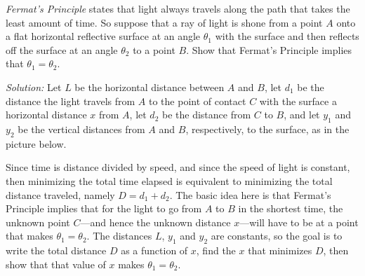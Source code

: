 \begin{exmp}\label{exmp:minmax4}
\noindent\emph{Fermat's Principle} states that light
always travels along the path that takes the least amount of time. So suppose
that a ray of light is shone from a point $A$ onto a flat horizontal reflective
surface at an angle $\theta_1$ with the surface and then reflects off the
surface at an angle $\theta_2$ to a point $B$. Show that Fermat's Principle
implies that $\theta_1 = \theta_2$.\vspace{1mm}
\par\noindent\emph{Solution:} Let $L$ be the horizontal distance between $A$ and
$B$, let $d_1$ be the distance the light travels from $A$ to the point of contact
$C$ with the surface a horizontal distance $x$ from $A$, let $d_2$ be the
distance from $C$ to $B$, and let $y_1$ and $y_2$ be the vertical distances
from $A$ and $B$, respectively, to the surface, as in the picture below.

\begin{center}
\end{center}

Since time is distance divided by speed, and since the speed of light is
constant, then minimizing the total time elapsed is equivalent to minimizing the
total distance traveled, namely $D = d_1 + d_2$. The basic idea here is that
Fermat's Principle implies that for the light to go from $A$ to $B$ in the
shortest time, the unknown point $C$---and hence the unknown distance $x$---will
have to be at a point that makes $\theta_1 = \theta_2$. The distances $L$,
$y_1$ and $y_2$ are constants, so the goal is to write the total distance $D$ as
a function of $x$, find the $x$ that minimizes $D$, then show that that value of
$x$ makes $\theta_1 = \theta_2$.


\end{exmp}
